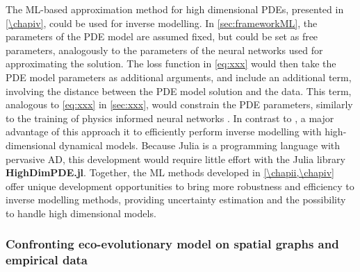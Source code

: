 The ML-based approximation method for high dimensional PDEs, presented in \cref{\chapiv}, could be used for inverse modelling.
% 
In \cref{sec:frameworkML}, the parameters of the PDE model are assumed fixed, but could be set as free parameters, analogously to the parameters of the neural networks used for approximating the solution. The loss function in \cref{eq:xxx} would then take the PDE model parameters as additional arguments, and include an additional term, involving the distance between the PDE model solution and the data. This term, analogous to \cref{eq:xxx} in \cref{sec:xxx}, would constrain the PDE parameters, similarly to the training of physics informed neural networks \citep{Raissi2019,Yazdani2020}.
% 
In contrast to \cite{Raissi2019,Yazdani2020}, a major advantage of this approach it to efficiently perform inverse modelling with high-dimensional dynamical models. Because Julia is a programming language with pervasive AD, this development would require little effort with the Julia library \textbf{HighDimPDE.jl}.
% 
Together, the ML methods developed in \cref{\chapii,\chapiv} offer unique development opportunities to bring more robustness and efficiency to inverse modelling methods, providing uncertainty estimation and the possibility to handle high dimensional models.





\subsubsection{Confronting eco-evolutionary model on spatial graphs and empirical data}

